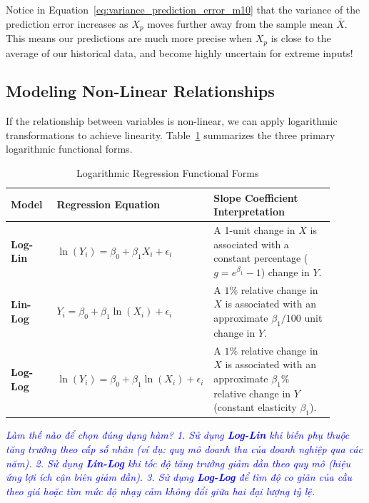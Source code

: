 \begin{examtip}
Notice in Equation~\ref{eq:variance_prediction_error_m10} that the variance of the prediction error increases as $X_p$ moves further away from the sample mean $\bar{X}$. This means our predictions are much more precise when $X_p$ is close to the average of our historical data, and become highly uncertain for extreme inputs!
\end{examtip}

\subsection{Modeling Non-Linear Relationships}
If the relationship between variables is non-linear, we can apply logarithmic transformations to achieve linearity. Table~\ref{tab:mod10_functional_forms} summarizes the three primary logarithmic functional forms.

\begin{table}[!htbp]
\centering
\caption{Logarithmic Regression Functional Forms}
\label{tab:mod10_functional_forms}
\begin{tabular}{p{0.15\linewidth} p{0.30\linewidth} p{0.45\linewidth}}
	\toprule
	\textbf{Model} & \textbf{Regression Equation} & \textbf{Slope Coefficient Interpretation} \\
	\midrule
	\textbf{Log-Lin} & $\ln(Y_i) = \beta_0 + \beta_1 X_i + \epsilon_i$ & A 1-unit change in $X$ is associated with  a constant percentage ($g = e^{\beta_1} - 1$) change in $Y$. \\
	\midrule
	\textbf{Lin-Log} & $Y_i = \beta_0 + \beta_1 \ln(X_i) + \epsilon_i$ & A $1\%$ relative change in $X$ is associated with an approximate $\beta_1 / 100$ unit change in $Y$. \\
	\midrule
	\textbf{Log-Log} & $\ln(Y_i) = \beta_0 + \beta_1 \ln(X_i) + \epsilon_i$ & A $1\%$ relative change in $X$ is associated with an approximate $\beta_1\%$ relative change in $Y$ (constant elasticity $\beta_1$). \\
	\bottomrule
\end{tabular}
\end{table}

\textcolor{blue}{\textit{Làm thế nào để chọn đúng dạng hàm?
1. Sử dụng \textbf{Log-Lin} khi biến phụ thuộc tăng trưởng theo cấp số nhân (ví dụ: quy mô doanh thu của doanh nghiệp qua các năm).
2. Sử dụng \textbf{Lin-Log} khi tốc độ tăng trưởng giảm dần theo quy mô (hiệu ứng lợi ích cận biên giảm dần).
3. Sử dụng \textbf{Log-Log} để tìm độ co giãn của cầu theo giá hoặc tìm mức độ nhạy cảm không đổi giữa hai đại lượng tỷ lệ.}}

